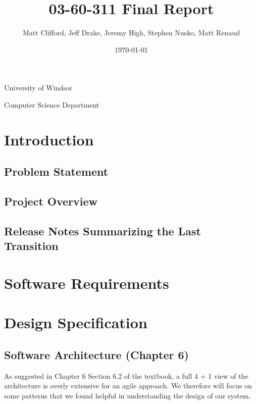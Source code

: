 \documentclass[11pt]{article}
\title{03-60-311 Final Report}
\author{Matt Clifford, Jeff Drake, Jeremy High, Stephen Nusko, Matt Renaud}
\date{\today}
\begin{document}
\maketitle

\vspace{1in}

\begin{center}
  University of Windsor

  Computer Science Department
\end{center}

\newpage
\setcounter{tocdepth}{3}
\tableofcontents
\vspace*{1cm}

\section{Introduction}

\subsection{Problem Statement}

\subsection{Project Overview}

\subsection{Release Notes Summarizing the Last Transition}

\section{Software Requirements}

\section{Design Specification}

\subsection{Software Architecture (Chapter 6)}
	As suggested in Chapter 6 Section 6.2 of the textbook, a full 4 + 1 view of the architecture is overly extensive for an agile approach.
	We therefore will focus on some patterns that we found helpful in understanding the design of our system.
\end{document}
